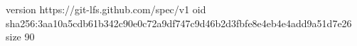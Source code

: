 version https://git-lfs.github.com/spec/v1
oid sha256:3aa10a5cdb61b342c90e0c72a9df747c9d46b2d3fbfe8e4eb4e4add9a51d7e26
size 90
